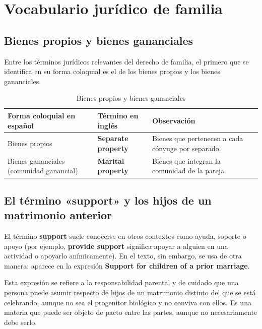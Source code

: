 \documentclass[12pt,oneside]{book}
\begin{document}
\chapter[Vocabulario jurídico de familia]{Vocabulario jurídico de familia}

\section{Bienes propios y bienes gananciales}

Entre los términos jurídicos relevantes del derecho de familia, el primero que se identifica en su forma coloquial es el de los bienes propios y los bienes gananciales.

\begin{table}[H]
\centering
\caption{Bienes propios y bienes gananciales}
\begin{tabularx}{\textwidth}{@{}>{\raggedright\arraybackslash}p{}>{\raggedright\arraybackslash}p{}Y@{}}
\toprule
\textbf{Forma coloquial en español} & \textbf{Término en inglés} & \textbf{Observación} \\
\midrule
Bienes propios & \textbf{Separate property} & Bienes que pertenecen a cada cónyuge por separado. \\
Bienes gananciales (comunidad ganancial) & \textbf{Marital property} & Bienes que integran la comunidad de la pareja. \\
\bottomrule
\end{tabularx}
\end{table}

\section{El término «support» y los hijos de un matrimonio anterior}

El término \textbf{support} suele conocerse en otros contextos como ayuda, soporte o apoyo (por ejemplo, \textbf{provide support} significa apoyar a alguien en una actividad o apoyarlo anímicamente). En el texto, sin embargo, se usa de otra manera: aparece en la expresión \textbf{Support for children of a prior marriage}.

Esta expresión se refiere a la responsabilidad parental y de cuidado que una persona puede asumir respecto de hijos de un matrimonio distinto del que se está celebrando, aunque no sea el progenitor biológico y no conviva con ellos. Es una materia que puede ser objeto de pacto entre las partes, aunque no necesariamente debe serlo.
\end{document}
